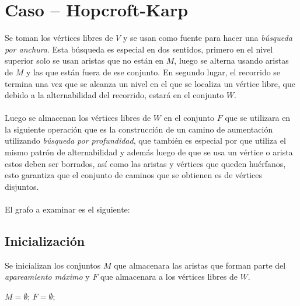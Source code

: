\documentclass[12pt,a4paper]{article}
\begin{document}
\section{Caso -- Hopcroft-Karp} \noindent
Se toman los vértices libres de $V$ y se usan como fuente para hacer una \textit{búsqueda por anchura}. Esta búsqueda es especial en dos sentidos, primero en el nivel superior solo se usan aristas que no están en $M$, luego se alterna usando aristas de $M$ y las que están fuera de ese conjunto. En segundo lugar, el recorrido se termina una vez que se alcanza un nivel en el que se localiza un vértice libre, que debido a la alternabilidad del recorrido, estará en el conjunto $W$.\\\\
Luego se almacenan los vértices libres de $W$ en el conjunto $F$ que se utilizara en la siguiente operación que es la construcción de un camino de aumentación utilizando \textit{búsqueda por profundidad}, que también es especial por que utiliza el mismo patrón de alternabilidad y además luego de que se usa un vértice o arista estos deben ser borrados, así como las aristas y vértices que queden huérfanos, esto garantiza que el conjunto de caminos que se obtienen es de vértices disjuntos.\\\\
El grafo a examinar es el siguiente:
\begin{center}
\end{center}

\subsection{Inicialización}
Se inicializan los conjuntos $M$ que almacenara las aristas que forman parte del \textit{apareamiento máximo} y $F$ que almacenara a los vértices libres de $W$.
\begin{center}
$M=\emptyset$; $F=\emptyset$;
\end{center}
\end{document}
